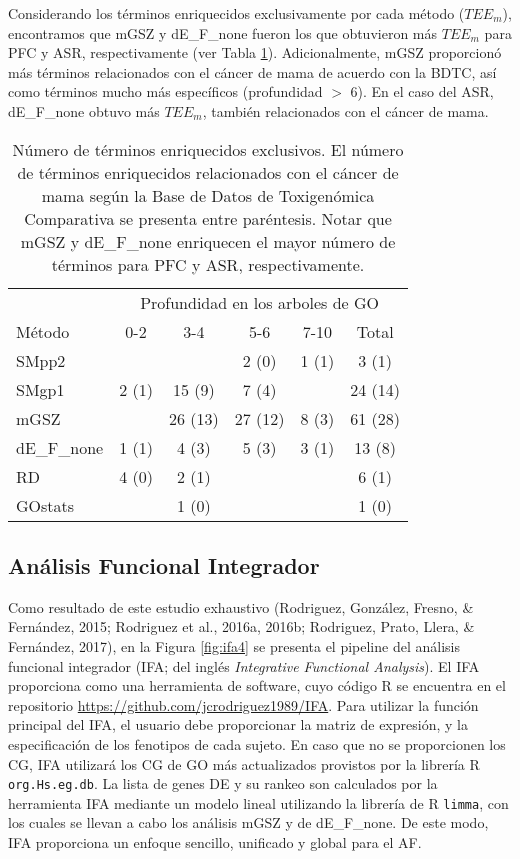 \documentclass[12pt,twoside]{reedthesis}
\begin{document}
\par

Considerando los términos enriquecidos exclusivamente por cada método (\(TEE_m\)), encontramos que mGSZ y dE\_F\_none fueron los que obtuvieron más \(TEE_m\) para PFC y ASR, respectivamente (ver Tabla \ref{tab:eet}). Adicionalmente, mGSZ proporcionó más términos relacionados con el cáncer de mama de acuerdo con la BDTC, así como términos mucho más específicos (profundidad \(>\) 6). En el caso del ASR, dE\_F\_none obtuvo más \(TEE_m\), también relacionados con el cáncer de mama.
\begin{table}[!htbp]
\centering
\caption{Número de términos enriquecidos exclusivos. El número de términos enriquecidos relacionados con el cáncer de mama según la Base de Datos de Toxigenómica Comparativa se presenta entre paréntesis. Notar que mGSZ y dE\_F\_none enriquecen el mayor número de términos para PFC y ASR, respectivamente.}
\begin{tabular}{lccccc}
& \multicolumn{5}{c}{Profundidad en los arboles de GO} \\ \cline{2-6}
Método & 0-2 & 3-4 & 5-6 & 7-10 & Total \\
\hline
SMpp2 & & & 2 (0) & 1 (1) & 3 (1) \\
SMgp1 & 2 (1) & 15 (9) & 7 (4) & & 24 (14) \\
mGSZ & & 26 (13) & 27 (12) & 8 (3) & 61 (28) \\
dE\_F\_none & 1 (1) & 4 (3) & 5 (3) & 3 (1) & 13 (8) \\
RD & 4 (0) & 2 (1) & & & 6 (1) \\
GOstats & & 1 (0) & & & 1 (0) \\
\hline
\end{tabular}
\label{tab:eet}
\end{table}
\hypertarget{sec:ifa}{%
\subsection{Análisis Funcional Integrador}\label{sec:ifa}}

\par

Como resultado de este estudio exhaustivo (Rodriguez, González, Fresno, \& Fernández, 2015; Rodriguez et al., 2016a, 2016b; Rodriguez, Prato, Llera, \& Fernández, 2017), en la Figura \ref{fig:ifa4} se presenta el pipeline del análisis funcional integrador (IFA; del inglés \emph{Integrative Functional Analysis}). El IFA proporciona como una herramienta de software, cuyo código R se encuentra en el repositorio \url{https://github.com/jcrodriguez1989/IFA}. Para utilizar la función principal del IFA, el usuario debe proporcionar la matriz de expresión, y la especificación de los fenotipos de cada sujeto. En caso que no se proporcionen los CG, IFA utilizará los CG de GO más actualizados provistos por la librería R \texttt{org.Hs.eg.db}. La lista de genes DE y su rankeo son calculados por la herramienta IFA mediante un modelo lineal utilizando la librería de R \texttt{limma}, con los cuales se llevan a cabo los análisis mGSZ y de dE\_F\_none. De este modo, IFA proporciona un enfoque sencillo, unificado y global para el AF.
\end{document}
